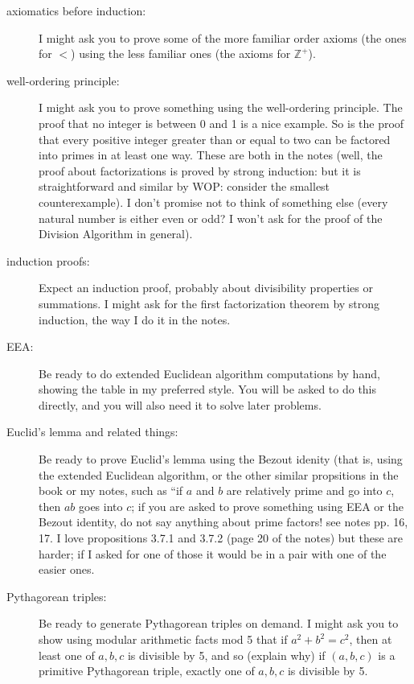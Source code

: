 \documentclass[12pt]{article}
\begin{document}
\begin{description}

\item[axiomatics before induction:]  I might ask you to prove some of the more familiar order axioms (the ones for $<$) using the less familiar ones (the axioms for ${\mathbb Z}^+$).

\item[well-ordering principle:]  I might ask you to prove something using the well-ordering principle.  The proof that no integer is between 0 and 1 is a nice example.  So is the proof that every positive integer greater than or equal to two can be factored into primes in at least one way.  These are both in the notes (well, the proof about factorizations is proved by strong induction: but it is straightforward and similar by WOP:  consider the smallest counterexample).  I don't promise not to think of something else (every natural number is either even or odd?  I won't ask for the proof of the Division Algorithm in general).

\item[induction proofs:]  Expect an induction proof, probably about divisibility properties or summations.  I might ask for the first factorization theorem by strong induction, the way I do it in the notes.

\item[EEA:]    Be ready to do extended Euclidean algorithm computations by hand, showing the table in my preferred style.  You will be asked to do this directly, and you will also need it to solve later problems.

\item[Euclid's lemma and related things:]  Be ready to prove Euclid's lemma using the Bezout idenity (that is, using the extended Euclidean algorithm, or the other similar propsitions in the book or my notes, such as ``if $a$ and $b$ are relatively prime and go into $c$, then $ab$ goes into $c$;   if you are asked to prove something using EEA or the Bezout identity, do not say anything about prime factors!  see notes pp. 16, 17.   I love propositions 3.7.1 and 3.7.2 (page 20 of the notes) but these are harder;  if I asked for one of those it would be in a pair with one of the easier ones.

\item[Pythagorean triples:]   Be ready to generate Pythagorean triples on demand.  I might ask you to show using modular arithmetic facts mod 5
that if $a^2+b^2 = c^2$, then at least one of $a,b,c$ is divisible by 5, and so (explain why) if $(a,b,c)$ is a primitive Pythagorean triple, exactly one of $a,b,c$ is divisible by 5.


\end{description}
\end{document}

